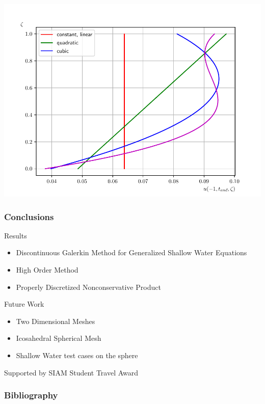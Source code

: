 \documentclass[10pt]{beamer}
\begin{document}
\begin{frame}
        \includegraphics[scale=0.29]{Figures/velocity_profile_-1_dam.pdf}
    \end{frame}

    \begin{frame}
      \frametitle{Conclusions}
      Results
      \begin{itemize}
        \item Discontinuous Galerkin Method for Generalized Shallow Water Equations
        \item High Order Method
        \item Properly Discretized Nonconservative Product
      \end{itemize}
      Future Work
      \begin{itemize}
        \item Two Dimensional Meshes
        \item Icosahedral Spherical Mesh
        \item Shallow Water test cases on the sphere
      \end{itemize}

      Supported by SIAM Student Travel Award
    \end{frame}

    \begin{frame}[allowframebreaks]
      \frametitle{Bibliography}
      \nocite{*}
      \printbibliography{}
    \end{frame}
\end{document}
